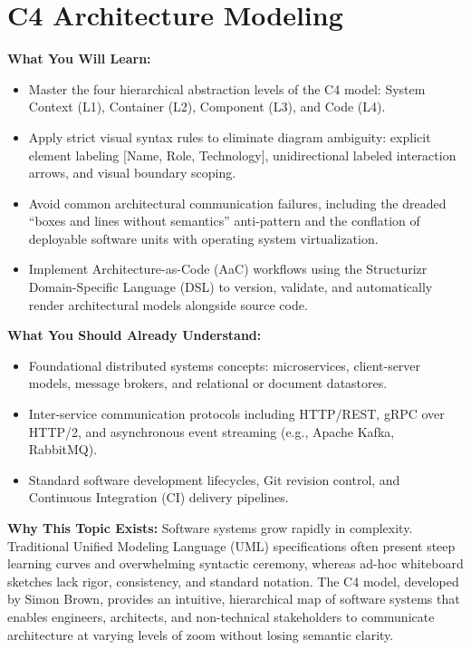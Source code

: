 \chapter{C4 Architecture Modeling}
\label{ch:c4-architecture}

\begin{chaptergoalsbox}
\textbf{What You Will Learn:}
\begin{itemize}[leftmargin=12pt]
  \item Master the four hierarchical abstraction levels of the C4 model: System Context (L1), Container (L2), Component (L3), and Code (L4).
  \item Apply strict visual syntax rules to eliminate diagram ambiguity: explicit element labeling [Name, Role, Technology], unidirectional labeled interaction arrows, and visual boundary scoping.
  \item Avoid common architectural communication failures, including the dreaded ``boxes and lines without semantics'' anti-pattern and the conflation of deployable software units with operating system virtualization.
  \item Implement Architecture-as-Code (AaC) workflows using the Structurizr Domain-Specific Language (DSL) to version, validate, and automatically render architectural models alongside source code.
\end{itemize}

\textbf{What You Should Already Understand:}
\begin{itemize}[leftmargin=12pt]
  \item Foundational distributed systems concepts: microservices, client-server models, message brokers, and relational or document datastores.
  \item Inter-service communication protocols including HTTP/REST, gRPC over HTTP/2, and asynchronous event streaming (e.g., Apache Kafka, RabbitMQ).
  \item Standard software development lifecycles, Git revision control, and Continuous Integration (CI) delivery pipelines.
\end{itemize}

\textbf{Why This Topic Exists:}
Software systems grow rapidly in complexity. Traditional Unified Modeling Language (UML) specifications often present steep learning curves and overwhelming syntactic ceremony, whereas ad-hoc whiteboard sketches lack rigor, consistency, and standard notation. The C4 model, developed by Simon Brown, provides an intuitive, hierarchical map of software systems that enables engineers, architects, and non-technical stakeholders to communicate architecture at varying levels of zoom without losing semantic clarity.


\end{chaptergoalsbox}
